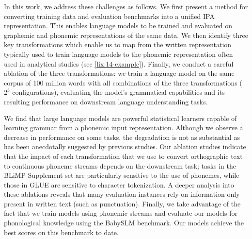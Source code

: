 In this work, we address these challenges as follows. We first present a method for converting training data and evaluation benchmarks into a unified IPA representation. This enables language models to be trained and evaluated on graphemic and phonemic representations of the same data. We then identify three key transformations which enable us to map from the written representation typically used to train language models to the phonemic representation often used in analytical studies (see \cref{fix:14-example}). Finally, we conduct a careful ablation of the three transformations: we train a language model on the same corpus of 100 million words with all combinations of the three transformations ($2^3$ configurations), evaluating the model's grammatical capabilities and its resulting performance on downstream language understanding tasks. 


We find that large language models are powerful statistical learners capable of learning grammar from a phonemic input representation. Although we observe a decrease in performance on some tasks, the degradation is not as substantial as has been anecdotally suggested by previous studies. Our ablation studies indicate that the impact of each transformation that we use to convert orthographic text to continuous phoneme streams depends on the downstream task; tasks in the BLiMP Supplement set are particularly sensitive to the use of phonemes, while those in GLUE are sensitive to character tokenization. A deeper analysis into these ablations reveals that many evaluation instances rely on information only present in written text (such as punctuation). Finally, we take advantage of the fact that we train models using phonemic streams and evaluate our models for phonological knowledge using the BabySLM benchmark. Our models achieve the best scores on this benchmark to date.%



